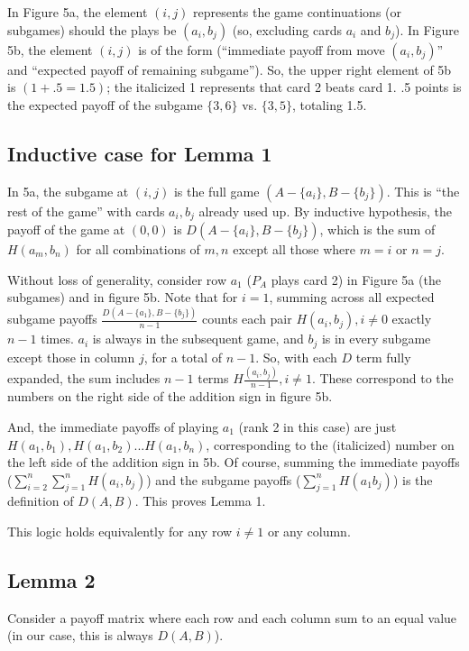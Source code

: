 \documentclass[11pt, oneside]{article} 	%
\begin{document}
In Figure 5a, the element $(i,j)$ represents  the game continuations (or subgames) should the plays be $(a_i, b_j)$ (so, excluding cards $a_i$ and $b_j$). 
In Figure 5b, the element  $(i,j)$ is of the form (``immediate payoff from move $(a_i, b_j)$'' and ``expected payoff of remaining subgame'').  So, the upper right element of 5b is $(\mathit{1} + .5 = 1.5)$; the italicized 1 represents that card 2 beats card 1.  .5 points is the expected payoff of the subgame $\{3,6\}$ vs. $\{3,5\}$, totaling 1.5. 

\subsection{Inductive case for Lemma 1}

In 5a, the subgame at $(i, j)$ is the full game $(A - \{a_i\}, B-\{b_j\})$.  This is ``the rest of the game'' with cards $a_i, b_j$ already used up.  By inductive hypothesis, the payoff of the game at $(0,0)$ is $D(A-\{a_i\}, B-\{b_j\})$, which is the sum of $H(a_m, b_n)$ for all combinations of $m, n$ except all those where $m=i$ or $n=j$.  

Without loss of generality, consider row $a_1$ ($P_A$ plays card 2) in Figure 5a (the subgames) and in figure 5b.  Note that for $i=1$, summing across all expected subgame payoffs $\frac{D(A-\{a_1\}, B-\{b_j\})}{n-1}$ counts each pair $H(a_i, b_j), i \neq 0$ exactly $n-1$ times.  $a_i$ is always in the subsequent game, and $b_j$ is in every subgame except those in column $j$, for a total of $n-1$.  So, with each $D$ term fully expanded, the sum includes $n-1$ terms $H\frac{(a_i, b_j)}{n-1}, i \neq 1$.  These correspond to the numbers on the right side of the addition sign in figure 5b.

And, the immediate payoffs of playing $a_1$ (rank 2 in this case) are just $H(a_1, b_1), H(a_1, b_2)... H(a_1, b_n)$, corresponding to the (italicized) number on the left side of the addition sign in 5b.  Of course, summing the immediate payoffs ($\sum_{i=2}^n\sum_{j=1}^n H(a_i, b_j)$) and the subgame payoffs  ($\sum_{j=1}^n H(a_1 b_j)$) is the definition of $D(A,B)$.  This proves Lemma 1.

This logic holds equivalently for any row $i \neq 1$ or any column.

\subsection{Lemma 2}

Consider a payoff matrix where each row and each column sum to an equal value (in our case, this is always $D(A,B)$).
\end{document}
